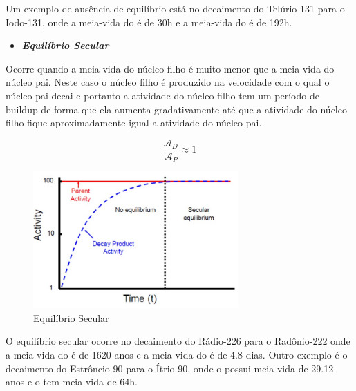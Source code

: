 \documentclass[11pt,a4paper]{article}
\newcounter{exemplo}
\begin{document}
                    Um exemplo de ausência de equilíbrio está no decaimento do Telúrio-131 para o Iodo-131, onde a meia-vida do  é de 30h e a meia-vida do  é de 192h.

                \begin{itemize}
                    \item \textbf{\textit{\textcolor{CarnationPink}{Equilíbrio Secular}}}
                \end{itemize}
        
                    Ocorre quando a meia-vida do núcleo filho é muito menor que a meia-vida do núcleo pai. Neste caso o núcleo filho é produzido na velocidade com o qual o núcleo pai decai e portanto a atividade do núcleo filho tem um período de buildup de forma que ela aumenta gradativamente até que a atividade do núcleo filho fique aproximadamente igual a atividade do núcleo pai. 

                    \begin{equation}
                        \frac{\mathcal{A}_D}{\mathcal{A}_P} \approx 1
                    \end{equation}

                    \begin{figure}[h]
                        \centering
                        \includegraphics[width=0.7\textwidth]{Imagens/graficoEquilibrioSecular.jpg}
                        \caption{Equilíbrio Secular}
                        \label{fig:graficoEquilibrioSecular}
                    \end{figure}

                    O equilíbrio secular ocorre no decaimento do Rádio-226 para o Radônio-222 onde a meia-vida do  é de 1620 anos e a meia vida do  é de 4.8 dias. Outro exemplo é o decaimento do Estrôncio-90 para o Ítrio-90, onde o  possui meia-vida de 29.12 anos e o  tem meia-vida de 64h.
\end{document}
